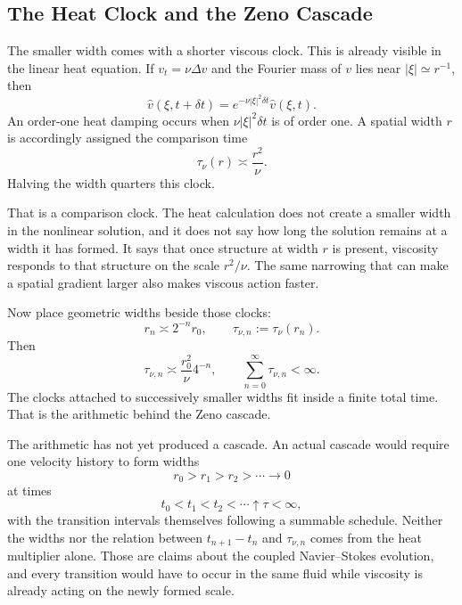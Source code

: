 \subsection{The Heat Clock and the Zeno Cascade}\label{sub:BodyHeatClock}

The smaller width comes with a shorter viscous clock.
This is already visible in the linear heat equation.
If \(v_t=\nu\Delta v\) and the Fourier mass of \(v\) lies near \(|\xi|\simeq r^{-1}\), then
\[
  \widehat v(\xi,t+\delta t)
  =e^{-\nu|\xi|^2\delta t}\widehat v(\xi,t).
\]
An order-one heat damping occurs when \(\nu|\xi|^2\delta t\) is of order one.
A spatial width \(r\) is accordingly assigned the comparison time
\begin{equation}\label{eq:BodyHeatComparisonTime}
  \tau_\nu(r)\asymp\frac{r^2}{\nu}.
\end{equation}
Halving the width quarters this clock.

That is a comparison clock.
The heat calculation does not create a smaller width in the nonlinear solution, and it does not say how long the solution remains at a width it has formed.
It says that once structure at width \(r\) is present, viscosity responds to that structure on the scale \(r^2/\nu\).
The same narrowing that can make a spatial gradient larger also makes viscous action faster.

Now place geometric widths beside those clocks:
\[
  r_n\asymp2^{-n}r_0,
  \qquad
  \tau_{\nu,n}:=\tau_\nu(r_n).
\]
Then
\[
  \tau_{\nu,n}
  \asymp\frac{r_0^2}{\nu}4^{-n},
  \qquad
  \sum_{n=0}^{\infty}\tau_{\nu,n}<\infty.
\]
The clocks attached to successively smaller widths fit inside a finite total time.
That is the arithmetic behind the Zeno cascade.

The arithmetic has not yet produced a cascade.
An actual cascade would require one velocity history to form widths
\[
  r_0>r_1>r_2>\cdots\longrightarrow0
\]
at times
\[
  t_0<t_1<t_2<\cdots\uparrow\tau<\infty,
\]
with the transition intervals themselves following a summable schedule.
Neither the widths nor the relation between \(t_{n+1}-t_n\) and \(\tau_{\nu,n}\) comes from the heat multiplier alone.
Those are claims about the coupled Navier--Stokes evolution, and every transition would have to occur in the same fluid while viscosity is already acting on the newly formed scale.

